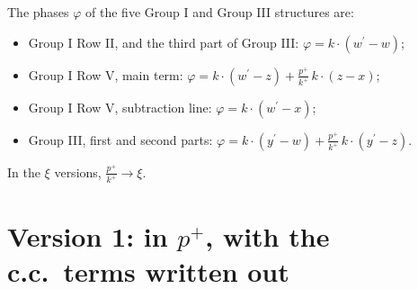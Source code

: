 \documentclass[10pt]{article}
\numberwithin{equation}{section}
\begin{document}
The phases $\varphi$ of the five Group I and Group III structures are:
\begin{itemize}
\item Group I Row II, and the third part of Group III: $\varphi=k\cdot(w^{\prime}-w)$;
\item Group I Row V, main term: $\varphi=k\cdot(w^{\prime}-z)+\frac{p^{+}}{k^{+}}\,k\cdot(z-x)$;
\item Group I Row V, subtraction line: $\varphi=k\cdot(w^{\prime}-x)$;
\item Group III, first and second parts: $\varphi=k\cdot(y^{\prime}-w)+\frac{p^{+}}{k^{+}}\,k\cdot(y^{\prime}-z)$.
\end{itemize}
In the $\xi$ versions, $\frac{p^{+}}{k^{+}}\to\xi$.
\section{Version 1: in $p^{+}$, with the c.c.\ terms written out}
\end{document}
